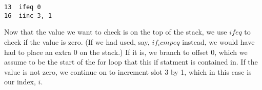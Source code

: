 \documentclass[11pt]{article}
\begin{document}
\begin{verbatim}
13  ifeq 0
16  iinc 3, 1
\end{verbatim}

Now that the value we want to check is on the top of the stack, we use $ifeq$ to check if the value is zero. (If we had used, say, $if_icmpeq$ instead, we would have had to place an extra 0 on the stack.) If it is, we branch to offset 0, which we assume to be the start of the for loop that this if statment is contained in. If the value is not zero, we continue on to increment slot 3 by 1, which in this case is our index, $i$.
\end{document}
